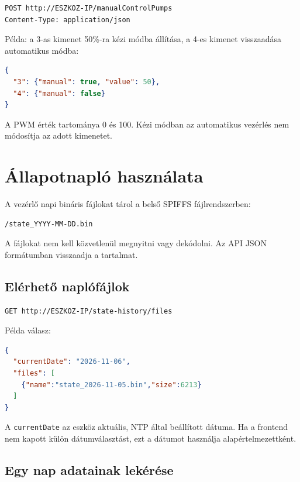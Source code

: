 \documentclass[11pt,a4paper]{article}
\begin{document}
\begin{lstlisting}
POST http://ESZKOZ-IP/manualControlPumps
Content-Type: application/json
\end{lstlisting}

Példa: a 3-as kimenet 50\%-ra kézi módba állítása, a 4-es kimenet visszaadása automatikus módba:

\begin{lstlisting}[language=json]
{
  "3": {"manual": true, "value": 50},
  "4": {"manual": false}
}
\end{lstlisting}

A PWM érték tartománya 0 és 100. Kézi módban az automatikus vezérlés nem módosítja az adott kimenetet.

\section{Állapotnapló használata}

A vezérlő napi bináris fájlokat tárol a belső SPIFFS fájlrendszerben:

\begin{lstlisting}
/state_YYYY-MM-DD.bin
\end{lstlisting}

A fájlokat nem kell közvetlenül megnyitni vagy dekódolni. Az API JSON formátumban visszaadja a tartalmat.

\subsection{Elérhető naplófájlok}

\begin{lstlisting}
GET http://ESZKOZ-IP/state-history/files
\end{lstlisting}

Példa válasz:

\begin{lstlisting}[language=json]
{
  "currentDate": "2026-11-06",
  "files": [
    {"name":"state_2026-11-05.bin","size":6213}
  ]
}
\end{lstlisting}

A \texttt{currentDate} az eszköz aktuális, NTP által beállított dátuma. Ha a frontend nem kapott külön dátumválasztást, ezt a dátumot használja alapértelmezettként.

\subsection{Egy nap adatainak lekérése}
\end{document}
